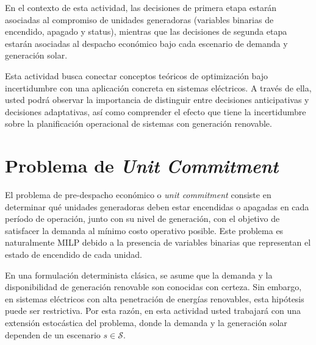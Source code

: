 \documentclass[
	spanish, %
	letterpaper, oneside
]{article}
\begin{document}
En el contexto de esta actividad, las decisiones de primera etapa estarán asociadas al compromiso de unidades generadoras (variables binarias de encendido, apagado y status), mientras que las decisiones de segunda etapa estarán asociadas al despacho económico bajo cada escenario de demanda y generación solar. 

Esta actividad busca conectar conceptos teóricos de optimización bajo incertidumbre con una aplicación concreta en sistemas eléctricos. A través de ella, usted podrá observar la importancia de distinguir entre decisiones anticipativas y decisiones adaptativas, así como comprender el efecto que tiene la incertidumbre sobre la planificación operacional de sistemas con generación renovable.

\section{Problema de \textit{Unit Commitment}}

El problema de pre-despacho económico o \textit{unit commitment} consiste en determinar qué unidades generadoras deben estar encendidas o apagadas en cada período de operación, junto con su nivel de generación, con el objetivo de satisfacer la demanda al mínimo costo operativo posible. Este problema es naturalmente MILP debido a la presencia de variables binarias que representan el estado de encendido de cada unidad.

En una formulación determinista clásica, se asume que la demanda y la disponibilidad de generación renovable son conocidas con certeza. Sin embargo, en sistemas eléctricos con alta penetración de energías renovables, esta hipótesis puede ser restrictiva. Por esta razón, en esta actividad usted trabajará con una extensión estocástica del problema, donde la demanda y la generación solar dependen de un escenario $s \in \mathcal{S}$.\\
\end{document}
